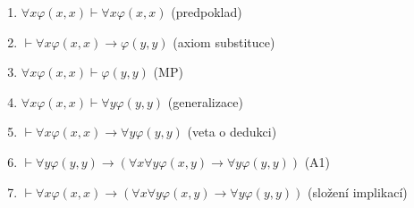 \begin{enumerate}[1)]
  \item $\forall x \varphi (x,x) \vdash \forall x \varphi (x,x)$ (predpoklad)
  \item $\vdash \forall x \varphi (x,x) \rightarrow \varphi (y,y)$ (axiom substituce)
  \item $\forall x \varphi (x,x) \vdash \varphi (y,y)$ (MP)
  \item $\forall x \varphi (x,x) \vdash \forall y \varphi (y,y)$ (generalizace)
  \item $\vdash \forall x \varphi (x,x) \rightarrow \forall y \varphi (y,y)$
(veta o dedukci)
  \item $\vdash \forall y \varphi (y,y) \rightarrow (\forall x \forall y \varphi(x,y) \rightarrow
          \forall y \varphi (y,y))$ (A1)
  \item $\vdash \forall x \varphi (x,x) \rightarrow (\forall x \forall y \varphi(x,y) \rightarrow
          \forall y \varphi (y,y))$ (složení implikací)
\end{enumerate}
